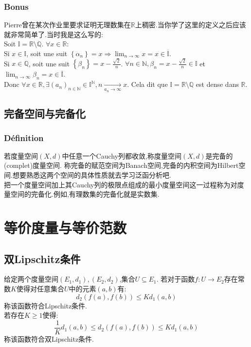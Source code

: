 \documentclass[12pt, a4paper, oneside]{ctexbook}
\newcommand{\R }{\mathbb{R}}%
\begin{document}
  \subsubsection{Bonus}
  Pierre曾在某次作业里要求证明无理数集在$\R$上稠密.当你学了这里的定义之后应该就非常简单了.当时我是这么写的:\\

    Soit $\mathbb{I} =\R\setminus \mathbb{Q}$.
    $\forall x\in \R$:\\
    \indent
    Si $x\in \mathbb{I}$, 
    soit une suit $\left \{ \alpha_n \right \}=x \Rightarrow 
    \lim_{n \to \infty}x=x\in \mathbb{\overline{I}}$.\\
    \indent
    Si $x\in \mathbb{Q}$, 
    soit une suit $\left \{ \beta_n \right \}=x-\frac{\sqrt{2}}{n}$. 
    $\forall n\in \mathbb{N}, \beta_n=x-\frac{\sqrt{2}}{n}\in \mathbb{I}$ et 
    $\lim_{n \to \infty}\beta_n=x\in \mathbb{\overline{I}}$.\\
    \indent
    Donc $\forall x\in \R, \exists (a_n)_{n\in\mathbb{N}}\in \mathbb{I}^{\mathbb{N}}, n\xrightarrow[a_n\rightarrow\infty]{}x$. 
    Cela dit que $\mathbb{I}=\R\setminus \mathbb{Q}$ est dense dans $\R$.\\


  \subsection{完备空间与完备化 }
  \subsubsection{Définition}
  若度量空间$(X,d)$中任意一个Cauchy列都收敛,称度量空间$(X,d)$是完备的(complet)度量空间.
  称完备的赋范空间为Banach空间,完备的内积空间为Hilbert空间.想要熟悉这两个空间的具体性质就去学习泛函分析吧.\\

  把一个度量空间加上其Cauchy列的极限点组成的最小度量空间这一过程称为对度量空间的完备化.例如,有理数集的完备化就是实数集.

\section{等价度量与等价范数 }  \label{myref:normeq}
  \subsection{双Lipschitz条件 }
  给定两个度量空间$(E_1,d_1),(E_2,d_2)$,集合$U\subseteq E_1$.
  若对于函数$f:U\rightarrow E_2$存在常数$K$使得对任意集合$U$中的元素$(a,b)$有:
  $$
  d_2(f(a),f(b))\leq Kd_1(a,b)
  $$
  称该函数符合Lipschitz条件.\\
  若存在$K\ge 1$使得:
  $$
  \frac{1}{K}d_1(a,b)\leq d_2(f(a),f(b))\leq Kd_1(a,b)
  $$
  称该函数符合双Lipschitz条件.
\end{document}

